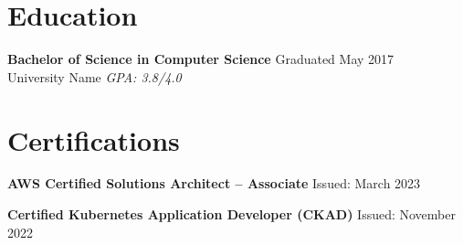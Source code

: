 \documentclass[11pt,letterpaper]{article}
\newcommand{\educationheader}[4]{
  \textbf{#1} \hfill #2 \\
  #3 \hfill \textit{#4}
  \vspace{-5pt}
}
\begin{document}
\section*{Education}

\educationheader{Bachelor of Science in Computer Science}{Graduated May 2017}{University Name}{GPA: 3.8/4.0}

\section*{Certifications}

\textbf{AWS Certified Solutions Architect -- Associate} \hfill Issued: March 2023

\textbf{Certified Kubernetes Application Developer (CKAD)} \hfill Issued: November 2022
\end{document}
